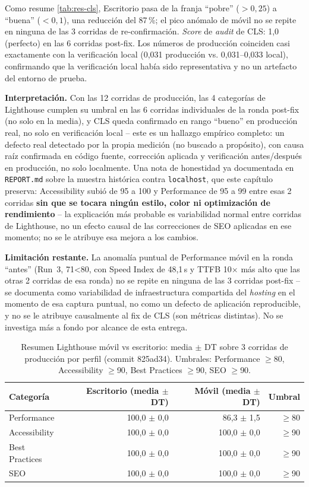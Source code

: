 Como resume \autoref{tab:res-cls}, Escritorio pasa de la franja ``pobre'' ($>0,25$) a ``buena'' ($<0,1$),
una reducción del 87\,\%; el pico anómalo de móvil no se repite en
ninguna de las 3 corridas de re-confirmación. \emph{Score} de
\emph{audit} de CLS: 1,0 (perfecto) en las 6 corridas post-fix. Los
números de producción coinciden casi exactamente con la verificación
local (0,031 producción vs. 0,031--0,033 local), confirmando que la
verificación local había sido representativa y no un artefacto del
entorno de prueba.

\textbf{Interpretación.} Con las 12 corridas de producción, las 4
categorías de Lighthouse cumplen su umbral en las 6 corridas
individuales de la ronda post-fix (no solo en la media), y CLS queda
confirmado en rango ``bueno'' en producción real, no solo en
verificación local -- este es un hallazgo empírico completo: un defecto
real detectado por la propia medición (no buscado a propósito), con
causa raíz confirmada en código fuente, corrección aplicada y
verificación antes/después en producción, no solo localmente. Una nota
de honestidad ya documentada en \texttt{REPORT.md} sobre la muestra
histórica contra \texttt{localhost}, que este capítulo preserva:
Accessibility subió de 95 a 100 y Performance de 95 a 99 entre esas 2
corridas \textbf{sin que se tocara ningún estilo, color ni optimización
de rendimiento} -- la explicación más probable es variabilidad normal
entre corridas de Lighthouse, no un efecto causal de las correcciones
de SEO aplicadas en ese momento; no se le atribuye esa mejora a los
cambios.

\textbf{Limitación restante.} La anomalía puntual de Performance móvil
en la ronda ``antes'' (Run~3, 71<80, con Speed Index de 48,1\,s y TTFB
10$\times$ más alto que las otras 2 corridas de esa ronda) no se repite
en ninguna de las 3 corridas post-fix -- se documenta como variabilidad
de infraestructura compartida del \emph{hosting} en el momento de esa
captura puntual, no como un defecto de aplicación reproducible, y no se
le atribuye causalmente al fix de CLS (son métricas distintas). No se
investiga más a fondo por alcance de esta entrega.

\begin{table}[h]
\centering
\small
\begin{tabular}{lrrr}
\toprule
Categoría & Escritorio (media $\pm$ DT) & Móvil (media $\pm$ DT) & Umbral \\
\midrule
Performance & 100,0 $\pm$ 0,0 & 86,3 $\pm$ 1,5 & $\geq$80 \\
Accessibility & 100,0 $\pm$ 0,0 & 100,0 $\pm$ 0,0 & $\geq$90 \\
Best Practices & 100,0 $\pm$ 0,0 & 100,0 $\pm$ 0,0 & $\geq$90 \\
SEO & 100,0 $\pm$ 0,0 & 100,0 $\pm$ 0,0 & $\geq$90 \\
\bottomrule
\end{tabular}
\caption{Resumen Lighthouse móvil vs escritorio: media $\pm$ DT sobre 3 corridas de producción por perfil (commit 825ad34). Umbrales: Performance $\geq$80, Accessibility $\geq$90, Best Practices $\geq$90, SEO $\geq$90.}
\label{tab:res-lighthouse-perfiles}
\end{table}


